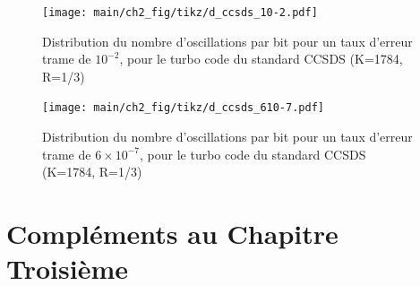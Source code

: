 \begin{figure}[!ht]
	\centering
	\texttt{[image: main/ch2\_fig/tikz/d\_ccsds\_10-2.pdf]}
	\caption{Distribution du nombre d'oscillations par bit pour un taux d'erreur trame de $10^{-2}$, pour le turbo code du standard CCSDS (K=1784, R=1/3)\label{fig:d1_ccsds}}
\end{figure}

\begin{figure}[!ht]
	\centering
	\texttt{[image: main/ch2\_fig/tikz/d\_ccsds\_610-7.pdf]}
	\caption{Distribution du nombre d'oscillations par bit pour un taux d'erreur trame de $6\times10^{-7}$, pour le turbo code du standard CCSDS (K=1784, R=1/3)\label{fig:d2_ccsds}}
\end{figure}


\chapter{Compléments au Chapitre Troisième}\label{sec:ann3}
\newpage
